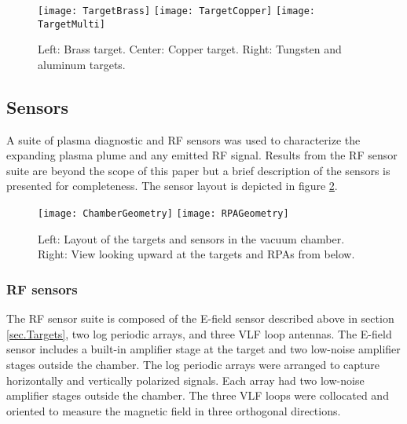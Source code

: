 \begin{figure}[\floatplace]
\begin{center}
\texttt{[image: TargetBrass]}
\texttt{[image: TargetCopper]}
\texttt{[image: TargetMulti]}
\end{center}
\caption{\label{fig.Targets} Left: Brass target. Center: Copper target. Right: Tungsten and aluminum targets.}
\end{figure}

\subsection{Sensors}
A suite of plasma diagnostic and RF sensors was used to characterize the expanding plasma plume and any emitted RF signal.  Results from the RF sensor suite are beyond the scope of this paper but a brief description of the sensors is presented for completeness.  The sensor layout is depicted in figure \ref{fig.ChamberGeometry}.

\begin{figure}[\floatplace]
\begin{center}
\texttt{[image: ChamberGeometry]}
\texttt{[image: RPAGeometry]}
\end{center}
\caption{\label{fig.ChamberGeometry} Left: Layout of the targets and sensors in the vacuum chamber. Right: View looking upward at the targets and RPAs from below.}
\end{figure}

\subsubsection{RF sensors}
The RF sensor suite is composed of the E-field sensor described above in section \ref{sec.Targets}, two log periodic arrays, and three VLF loop antennas.  The E-field sensor includes a built-in amplifier stage at the target and two low-noise amplifier stages outside the chamber.  The log periodic arrays were arranged to capture horizontally and vertically polarized signals.  Each array had two low-noise amplifier stages outside the chamber.  The three VLF loops were collocated and oriented to measure the magnetic field in three orthogonal directions.

